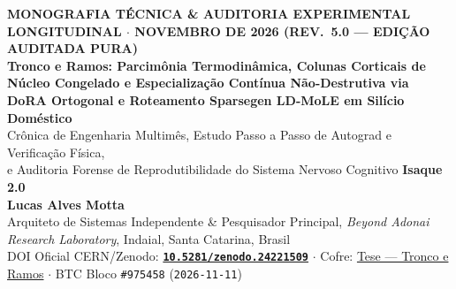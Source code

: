 \documentclass[10pt,a4paper]{article}
\begin{document}
\thispagestyle{empty}
\begin{center}
  {\footnotesize\color{tealaccent}\textbf{MONOGRAFIA T\'ECNICA \& AUDITORIA EXPERIMENTAL LONGITUDINAL $\cdot$ NOVEMBRO DE 2026 (REV.\ 5.0 --- EDI\c{C}\~AO AUDITADA PURA)}}\\[6pt]
  {\LARGE\bfseries\color{primary} Tronco e Ramos: Parcim\^onia Termodin\^amica, Colunas Corticais de N\'ucleo Congelado e Especializa\c{c}\~ao Cont\'inua N\~ao-Destrutiva via DoRA Ortogonal e Roteamento Sparsegen LD-MoLE em Sil\'icio Dom\'estico}\\[8pt]
  {\normalsize\color{slate} Cr\^onica de Engenharia Multim\^es, Estudo Passo a Passo de Autograd e Verifica\c{c}\~ao F\'isica,\\e Auditoria Forense de Reprodutibilidade do Sistema Nervoso Cognitivo \textbf{Isaque 2.0}}\\[10pt]
  {\normalsize\textbf{Lucas Alves Motta} }\\
  {\footnotesize Arquiteto de Sistemas Independente \& Pesquisador Principal, \textit{Beyond Adonai Research Laboratory}, Indaial, Santa Catarina, Brasil}\\
  {\footnotesize DOI Oficial CERN/Zenodo: \href{https://doi.org/10.5281/zenodo.24221509}{\textbf{\texttt{10.5281/zenodo.24221509}}} $\cdot$ Cofre: \href{https://drive.google.com/drive/folders/1xkl3xJ-djEBjyhXbT3oyg7OfOuUbD1lv}{Tese --- Tronco e Ramos} $\cdot$ BTC Bloco \texttt{\#975458} (\texttt{2026-11-11})}
\end{center}
\end{document}
